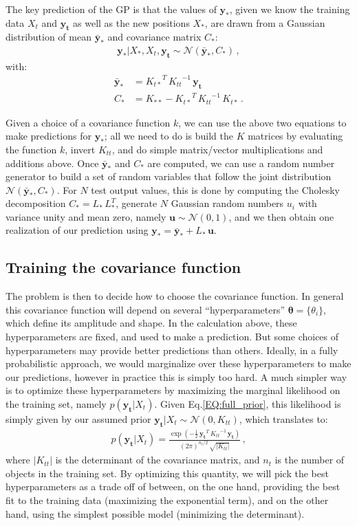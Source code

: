 \documentclass[11pt,a4paper]{article}
\newcommand\req[1]{Eq.\;\ref{#1}}
\newcommand{\abs}[1]{\left| #1 \right|}
\numberwithin{equation}{section}
\begin{document}
The key prediction of the GP is that the values of $\mathbf{y_*}$, given we know the training data $X_t$ and $\mathbf{y_t}$ as well as the new positions $X_*$, are drawn from a Gaussian distribution of mean $\mathbf{\bar{y}_*}$ and covariance matrix $C_*$:
\begin{align}
\mathbf{y_*} | X_*, X_t, \mathbf{y_t} \sim \mathcal{N}(\mathbf{\bar{y}_*}, C_*)\,,
\end{align}
with:
\begin{align}
\mathbf{\bar{y}_*} &= {K_{t*}}^T\,{K_{tt}}^{-1}\,\mathbf{y_t}\, \\
C_* &= K_{**} - {K_{t*}}^T\,{K_{tt}}^{-1}\,K_{t*}\,.
\end{align}

Given a choice of a covariance function $k$, we can use the above two equations to make predictions for $\mathbf{y_*}$; all we need to do is build the $K$ matrices by evaluating the function $k$, invert $K_{tt}$, and do simple matrix/vector multiplications and additions above. Once $\mathbf{\bar{y}_*}$ and $C_*$ are computed, we can use a random number generator to build a set of random variables that follow the joint distribution $\mathcal{N}(\mathbf{\bar{y}_*}, C_*)$. For $N$ test output values, this is done by computing the Cholesky decomposition $C_* = L_*\,L_*^T$, generate $N$ Gaussian random numbers $u_i$ with variance unity and mean zero, namely $\mathbf{u} \sim \mathcal{N}(0, 1)$, and we then obtain one realization of our prediction using $\mathbf{y_*} = \mathbf{\bar{y}_*} + L_*\,\mathbf{u}$.

\subsection{Training the covariance function}

The problem is then to decide how to choose the covariance function. In general this covariance function will depend on several ``hyperparameters'' ${\bm\theta} = \{\theta_i\}$, which define its amplitude and shape. In the calculation above, these hyperparameters are fixed, and used to make a prediction. But some choices of hyperparameters may provide better predictions than others. Ideally, in a fully probabilistic approach, we would marginalize over these hyperparameters to make our predictions, however in practice this is simply too hard. A much simpler way is to optimize these hyperparameters by maximizing the marginal likelihood on the training set, namely $p(\mathbf{y_t}|X_t)$. Given \req{EQ:full_prior}, this likelihood is simply given by our assumed prior $\mathbf{y_t} | X_t \sim \mathcal{N}(0,K_{tt})$, which translates to:
\begin{align}
p(\mathbf{y_t} | X_t) = \frac{\exp\left(-\frac{1}{2}\,\mathbf{y_t}^T\,{K_{tt}}^{-1}\,\mathbf{y_t}\right)}{(2\pi)^{n_t/2}\,\sqrt{\abs{K_{tt}}}}\,,
\end{align}
where $\abs{K_{tt}}$ is the determinant of the covariance matrix, and $n_t$ is the number of objects in the training set. By optimizing this quantity, we will pick the best hyperparameters as a trade off of between, on the one hand, providing the best fit to the training data (maximizing the exponential term), and on the other hand, using the simplest possible model (minimizing the determinant).
\end{document}
